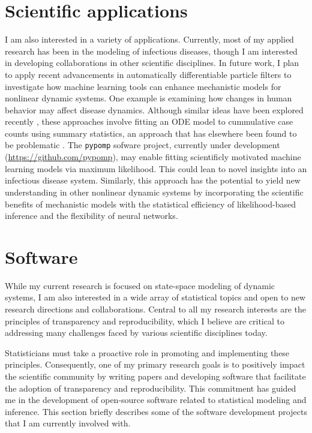 \documentclass{article}
\begin{document}
\section{Scientific applications}

I am also interested in a variety of applications.
Currently, most of my applied research has been in the modeling of infectious diseases, though I am interested in developing collaborations in other scientific disciplines.
In future work, I plan to apply recent advancements in automatically differentiable particle filters \cite{tan24} to investigate how machine learning tools can enhance mechanistic models for nonlinear dynamic systems.
One example is examining how changes in human behavior may affect disease dynamics.
Although similar ideas have been explored recently \cite{dandekar20,kim21}, these approaches involve fitting an ODE model to cummulative case counts using summary statistics, an approach that has elsewhere been found to be problematic \cite{king15}.
The \texttt{pypomp} sofware project, currently under development (\url{https://github.com/pypomp}), may enable fitting scientificly motivated machine learning models via maximum likelihood.
This could lean to novel insights into an infectious disease system.
Similarly, this approach has the potential to yield new understanding in other nonlinear dynamic systems by incorporating the scientific benefits of mechanistic models \cite{baker18} with the statistical efficiency of likelihood-based inference and the flexibility of neural networks.

\section{Software}\label{sec:software}

While my current research is focused on state-space modeling of dynamic systems, I am also interested in a wide array of statistical topics and open to new research directions and collaborations.
Central to all my research interests are the principles of transparency and reproducibility, which I believe are critical to addressing many challenges faced by various scientific disciplines today.

Statisticians must take a proactive role in promoting and implementing these principles.
Consequently, one of my primary research goals is to positively impact the scientific community by writing papers and developing software that facilitate the adoption of transparency and reproducibility.
This commitment has guided me in the development of open-source software related to statistical modeling and inference.
This section briefly describes some of the software development projects that I am currently involved with.
\end{document}

